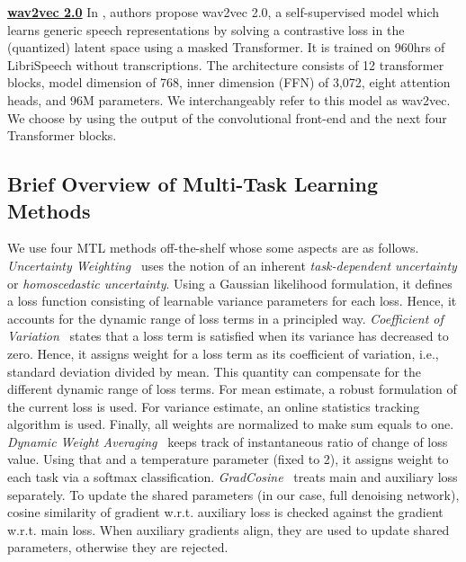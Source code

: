 \documentclass{article}
\begin{document}
\underline{\textbf{wav2vec 2.0}}
In \cite{baevski2020wav2vec}, authors propose wav2vec 2.0, a self-supervised model which learns generic speech representations by solving a contrastive loss in the (quantized) latent space using a masked Transformer.
It is trained on 960hrs of LibriSpeech without transcriptions.
The architecture
consists of 12 transformer blocks, model dimension of 768, inner dimension (\ac{FFN}) of 3,072, eight attention heads, and 96M parameters.
We interchangeably refer to this model as wav2vec.
We choose  by using the output of the convolutional front-end and the next four Transformer blocks.

\subsection{Brief Overview of Multi-Task Learning Methods}
We use four \ac{MTL} methods off-the-shelf whose some aspects are as follows.
\emph{Uncertainty Weighting}~\cite{kendall2018multi} uses the notion of an inherent \emph{task-dependent uncertainty} or \emph{homoscedastic uncertainty}.
Using a Gaussian likelihood formulation, it defines a loss function consisting of learnable variance parameters for each loss.
Hence, it accounts for the dynamic range of loss terms in a principled way.
\emph{Coefficient of Variation}~\cite{groenendijk2020multi} states that a loss term is satisfied when its variance has decreased to zero.
Hence, it assigns weight for a loss term as its coefficient of variation, i.e., standard deviation divided by mean.
This quantity can compensate for the different dynamic range of loss terms.
For mean estimate, a robust formulation of the current loss is used.
For variance estimate, an online statistics tracking algorithm is used.
Finally, all weights are normalized to make sum equals to one.
\emph{Dynamic Weight Averaging}~\cite{liu2019end} keeps track of instantaneous ratio of change of loss value.
Using that and a temperature parameter  (fixed to 2), it assigns weight to each task via a softmax classification.
\emph{GradCosine}~\cite{du2018adapting} treats main and auxiliary loss separately.
To update the shared parameters (in our case, full denoising network), cosine similarity of gradient w.r.t. auxiliary loss is checked against the gradient w.r.t. main loss.
When auxiliary gradients align, they are used to update shared parameters, otherwise they are rejected.
\end{document}

